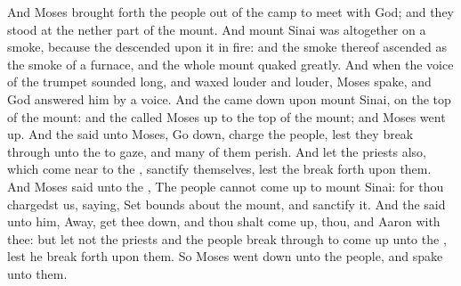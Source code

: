 \begin{biblechapter}
\verse And Moses brought forth the people out of the camp to meet with God; and they stood at the nether part of the mount.
\verse And mount Sinai was altogether on a smoke, because the \LORD descended upon it in fire: and the smoke thereof ascended as the smoke of a furnace, and the whole mount quaked greatly.
\verse And when the voice of the trumpet sounded long, and waxed louder and louder, Moses spake, and God answered him by a voice.
\verse And the \LORD came down upon mount Sinai, on the top of the mount: and the \LORD called Moses up to the top of the mount; and Moses went up.
\verse And the \LORD said unto Moses, Go down, charge the people, lest they break through unto the \LORD to gaze, and many of them perish.
\verse And let the priests also, which come near to the \LORD, sanctify themselves, lest the \LORD break forth upon them.
\verse And Moses said unto the \LORD, The people cannot come up to mount Sinai: for thou chargedst us, saying, Set bounds about the mount, and sanctify it.
\verse And the \LORD said unto him, Away, get thee down, and thou shalt come up, thou, and Aaron with thee: but let not the priests and the people break through to come up unto the \LORD, lest he break forth upon them.
\verse So Moses went down unto the people, and spake unto them.
\end{biblechapter}

\flushcolsend\columnbreak %


